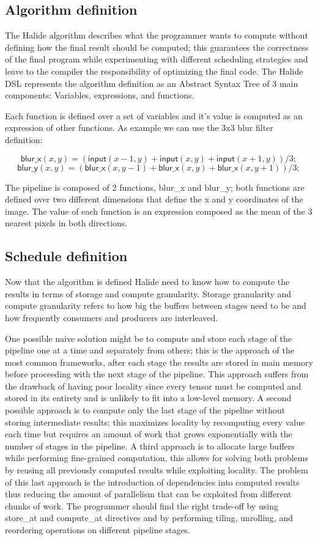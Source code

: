 \documentclass[../main.tex]{subfiles}
\begin{document}
\subsection{Algorithm definition}
The Halide algorithm describes what the programmer wants to compute without defining how the final result should be computed; this guarantees the correctness of the final program while experimenting with different scheduling strategies and leave to the compiler the responsibility of optimizing the final code.
The Halide DSL represents the algorithm definition as an Abstract Syntax Tree of 3 main components: Variables, expressions, and functions.

\newpage
Each function is defined over a set of variables and it's value is computed as an expression of other functions. As example we can use the 3x3 blur filter definition:

\[ \mathsf{blur\_x}(x, y) = (\mathsf{input}(x-1, y) + \mathsf{input}(x, y) + \mathsf{input}(x+1, y))/3;\]
\[ \mathsf{blur\_y}(x, y) = (\mathsf{blur\_x}(x, y-1) + \mathsf{blur\_x}(x, y) + \mathsf{blur\_x}(x, y+1))/3;\]

The pipeline is composed of 2 functions, blur\_x and blur\_y; both functions are defined over two different dimensions that define the x and y coordinates of the image. The value of each function is an expression composed as the mean of the 3 nearest pixels in both directions.


\subsection{Schedule definition}
Now that the algorithm is defined Halide need to know how to compute the results in terms of storage and compute granularity. Storage granularity and compute granularity refers to how big the buffers between stages need to be and how frequently consumers and producers are interleaved.

One possible naive solution might be to compute and store each stage of the pipeline one at a time and separately from others; this is the approach of the most common frameworks, after each stage the results are stored in main memory before proceeding with the next stage of the pipeline. This approach suffers from the drawback of having poor locality since every tensor must be computed and stored in its entirety and is unlikely to fit into a low-level memory. 
A second possible approach is to compute only the last stage of the pipeline without storing intermediate results; this maximizes locality by recomputing every value each time but requires an amount of work that grows exponentially with the number of stages in the pipeline.
A third approach is to allocate large buffers while performing fine-grained computation, this allows for solving both problems by reusing all previously computed results while exploiting locality. The problem of this last approach is the introduction of dependencies into computed results thus reducing the amount of parallelism that can be exploited from different chunks of work.
The programmer should find the right trade-off by using store\_at and compute\_at directives and by performing tiling, unrolling, and reordering operations on different pipeline stages.
\end{document}
